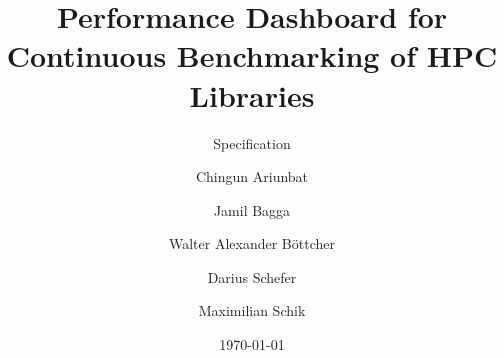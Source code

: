 \documentclass{beamer}
\title{Performance Dashboard for Continuous Benchmarking of HPC Libraries}
\subtitle{Specification}
\author{Chingun Ariunbat \and Jamil Bagga \and Walter Alexander Böttcher \and Darius Schefer \and Maximilian Schik}
\date{\today}
\begin{document}
\begin{frame}
    \titlepage
\end{frame}






\end{document}
